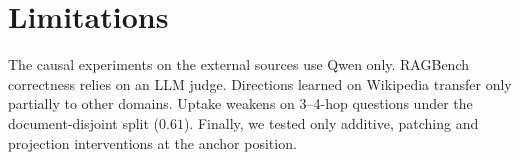 \section*{Limitations}
The causal experiments on the external sources use Qwen only. RAGBench correctness relies on an LLM judge. Directions learned on Wikipedia transfer only partially to other domains. Uptake weakens on 3--4-hop questions under the document-disjoint split ($0.61$). Finally, we tested only additive, patching and projection interventions at the anchor position.
